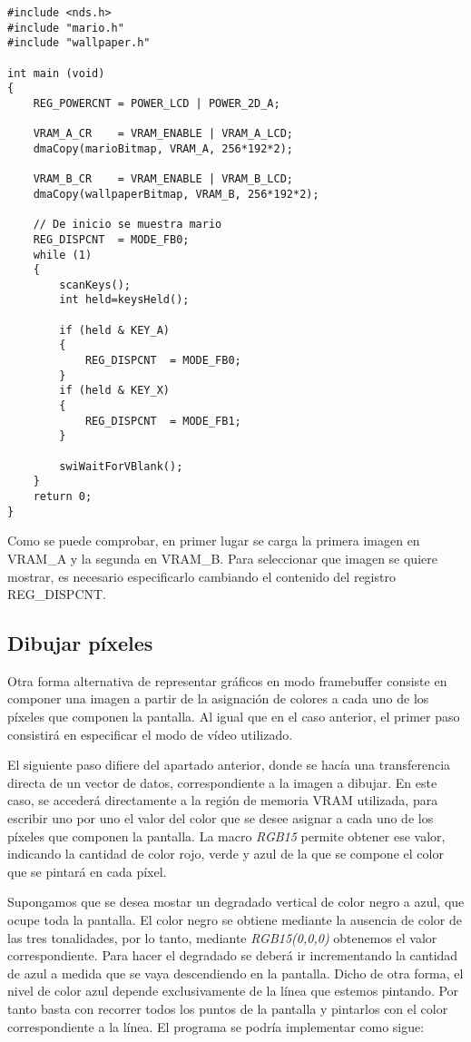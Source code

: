 \begin{lstlisting}
#include <nds.h>
#include "mario.h"
#include "wallpaper.h"

int main (void)
{
	REG_POWERCNT = POWER_LCD | POWER_2D_A;
	
	VRAM_A_CR    = VRAM_ENABLE | VRAM_A_LCD;
	dmaCopy(marioBitmap, VRAM_A, 256*192*2);
	
	VRAM_B_CR    = VRAM_ENABLE | VRAM_B_LCD;
	dmaCopy(wallpaperBitmap, VRAM_B, 256*192*2);
	
	// De inicio se muestra mario
	REG_DISPCNT  = MODE_FB0;
	while (1)
	{
		scanKeys();
		int held=keysHeld();
		
		if (held & KEY_A)
		{
			REG_DISPCNT  = MODE_FB0;
		}
		if (held & KEY_X)
		{
			REG_DISPCNT  = MODE_FB1;
		}
		
		swiWaitForVBlank();
	}
	return 0;
}
\end{lstlisting}

Como se puede comprobar, en primer lugar se carga la primera imagen en VRAM\_A y la segunda en VRAM\_B. Para seleccionar que imagen se quiere mostrar, es necesario especificarlo cambiando el contenido del registro REG\_DISPCNT.

\subsection{Dibujar píxeles}
\label{sec:p2_c3_pixeles}
Otra forma alternativa de representar gráficos en modo framebuffer consiste en componer una imagen a partir de la asignación de colores a cada uno de los píxeles que componen la pantalla. Al igual que en el caso anterior, el primer paso consistirá en especificar el modo de vídeo utilizado. 
	
El siguiente paso difiere del apartado anterior, donde se hacía una transferencia directa de un vector de datos, correspondiente a la imagen a dibujar. En este caso, se accederá directamente a la región de memoria VRAM utilizada, para escribir uno por uno el valor del color que se desee asignar a cada uno de los píxeles que componen la pantalla. La macro \textit{RGB15} permite obtener ese valor, indicando la cantidad de color rojo, verde y azul de la que se compone el color que se pintará en cada píxel.

Supongamos que se desea mostar un degradado vertical de color negro a azul, que ocupe toda la pantalla. El color negro se obtiene mediante la ausencia de color de las tres tonalidades, por lo tanto, mediante \textit{RGB15(0,0,0)} obtenemos el valor correspondiente. Para hacer el degradado se deberá ir incrementando la cantidad de azul a medida que se vaya descendiendo en la pantalla. Dicho de otra forma, el nivel de color azul depende exclusivamente de la línea que estemos pintando. Por tanto basta con recorrer todos los puntos de la pantalla y pintarlos con el color correspondiente a la línea. El programa se podría implementar como sigue:
	

